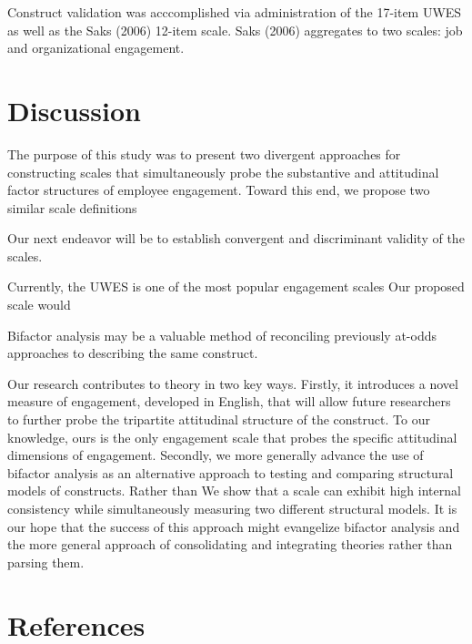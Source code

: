 \documentclass[
  english,
  man]{apa6}
\begin{document}
Construct validation was acccomplished via administration of the 17-item UWES as well as the Saks (2006) 12-item scale. Saks (2006) aggregates to two scales: job and organizational engagement.

\hypertarget{discussion}{%
\section{Discussion}\label{discussion}}

The purpose of this study was to present two divergent approaches for constructing scales that simultaneously probe the substantive and attitudinal factor structures of employee engagement. Toward this end, we propose two similar scale definitions

Our next endeavor will be to establish convergent and discriminant validity of the scales.

Currently, the UWES is one of the most popular engagement scales
Our proposed scale would

Bifactor analysis may be a valuable method of reconciling previously at-odds approaches to describing the same construct.

Our research contributes to theory in two key ways. Firstly, it introduces a novel measure of engagement, developed in English, that will allow future researchers to further probe the tripartite attitudinal structure of the construct. To our knowledge, ours is the only engagement scale that probes the specific attitudinal dimensions of engagement.
Secondly, we more generally advance the use of bifactor analysis as an alternative approach to testing and comparing structural models of constructs. Rather than
We show that a scale can exhibit high internal consistency while simultaneously measuring two different structural models.
It is our hope that the success of this approach might evangelize bifactor analysis and the more general approach of consolidating and integrating theories rather than parsing them.

\newpage

\hypertarget{references}{%
\section{References}\label{references}}

\begingroup
\setlength{\parindent}{-0.5in}
\setlength{\leftskip}{0.5in}
\end{document}
